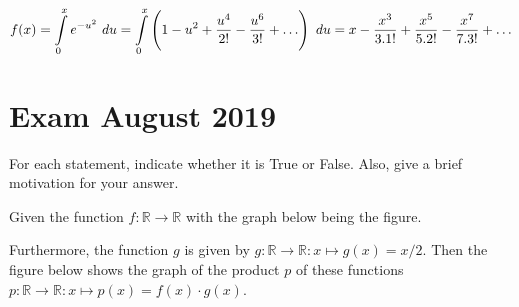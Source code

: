 \begin{Answer}
    $f(x)=\ds \int\limits_0^x e^{-u^2}\ du = \ds \int\limits_0^{x} \left(1 - u^2 + \dfrac{u^4}{2!} - \dfrac{u^6}{3!} + \ldots \right)\ du = x- \dfrac{x^3}{3.1!} + \dfrac{x^5}{5.2!} -\dfrac{x^7}{7.3!}  + \ldots $
\end{Answer}








\section{Exam August 2019}
\begin{Exercise} For each statement, indicate whether it is True or False. Also, give a brief motivation for your answer. 

\Question Given the function $f:\mathbb{R} \to \mathbb{R}$ with the graph below being the figure.
\begin{center}
\end{center}
Furthermore, the function $g$ is given by $g:\mathbb{R}\to \mathbb{R}: x\mapsto g(x)=x/2$. Then the figure below shows the graph of the product $p$ of these functions \\ $p:\mathbb{R} \to\mathbb{R}: x\mapsto p(x)=f(x) \cdot g(x)$.

\begin{center}
\begin{tikzpicture}[scale=1]


\end{tikzpicture}
\end{center}
\end{Exercise}
